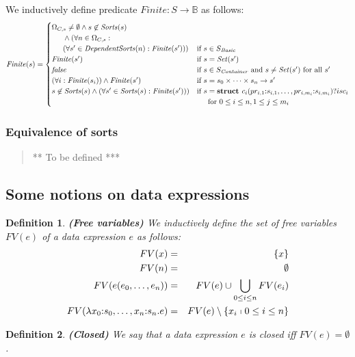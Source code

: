 \documentclass[a4paper,11pt]{article}
\newcommand{\comment}[1]{\begin{quotation} {\sf *** #1 ***} \end{quotation}}
\newcommand{\Bools}{{\mathbb B}}   %
\newcommand{\f}[1]{{\mathit{#1}}}
\newcommand{\Set}{{\mathit{Set}}}
\newcommand{\basicsort}{{S_{\mathit{Basic}}}}
\newcommand{\containersort}{{S_{\mathit{Container}}}}
\newtheorem{thdefinition}{Definition}[section]
\newenvironment{definition}
  {\begin{thdefinition}\em}
  {\end{thdefinition}}
\begin{document}
We inductively define predicate $\f{Finite}: S \rightarrow \Bools$ as follows:
\begin{equation*}
 \f{Finite}(s) = \begin{cases}
              \Omega_{C,s} \neq \emptyset \land s \not \in \f{Sorts}(s) & \\\indent \land (\forall n \in \Omega_{C,s}:\\\indent (\forall s' \in \f{DependentSorts}(n): \f{Finite}(s'))) & \text{if $s \in \basicsort$}\\
              \f{Finite}(s') & \text{if $s = \Set(s')$} \\
              \f{false} & \text{if $s \in \containersort$ and $s \neq \Set(s')$ for all $s'$}\\
              (\forall i: \f{Finite}(s_i)) \land \f{Finite}(s') & \text{if $s = s_0 \times \dots \times s_n \rightarrow s'$}\\
              s \not \in \f{Sorts}(s) \land (\forall s' \in \f{Sorts}(s): \f{Finite}(s'))) & \text{if $s = \textbf{struct } c_i(pr_{i,1}{:}s_{i,1}, \dots, pr_{i,m_i}{:}s_{i,m_i})?isc_i$}\\&\text{\indent for $0 \leq i \leq n, 1 \leq j \leq m_i$}
             \end{cases}
\end{equation*}

\subsubsection{Equivalence of sorts}
\comment{To be defined}

\subsection{Some notions on data expressions}
\begin{definition}\textbf{(Free variables)}
We inductively define the set of free variables $FV(e)$ of a data expression $e$ as follows:
\begin{eqnarray*}
FV(x) & = & \{ x \}\\
FV(n) & = & \emptyset\\
FV(e(e_0, \dots, e_n)) & = & FV(e) \cup \bigcup_{0 \leq i \leq n} FV(e_i)\\
FV(\lambda x_0{:}s_0, \dots, x_n{:}s_n . e) & = & FV(e) \setminus \{ x_i \shortmid 0 \leq i \leq n \}
\end{eqnarray*}
\end{definition}

\begin{definition}\textbf{(Closed)}
We say that a data expression $e$ is closed iff $FV(e) = \emptyset$.
\end{definition}
\end{document}
